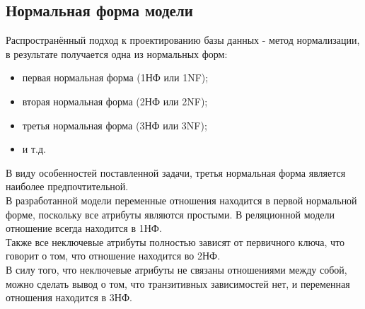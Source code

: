 	\subsection{Нормальная форма модели}
	Распространённый подход к проектированию базы данных - метод нормализации, в результате получается одна из нормальных форм:
	\begin{itemize}
		\item первая нормальная форма (1НФ или 1NF);
		\item вторая нормальная форма (2НФ или 2NF);
		\item третья нормальная форма (3НФ или 3NF);
		\item и т.д.
	\end{itemize}

	В виду особенностей поставленной задачи, третья нормальная форма является наиболее предпочтительной.\\
	
	В разработанной модели переменные отношения находится в первой нормальной форме, поскольку все атрибуты являются простыми. В реляционной модели отношение всегда находится в 1НФ.\\
	
	Также все неключевые атрибуты полностью зависят от первичного ключа, что говорит о том, что отношение находится во 2НФ. \cite{NF} \\
	
	В силу того, что неключевые атрибуты не связаны отношениями между собой, можно сделать вывод о том, что транзитивных зависимостей нет, и переменная отношения находится в 3НФ. \\
	
